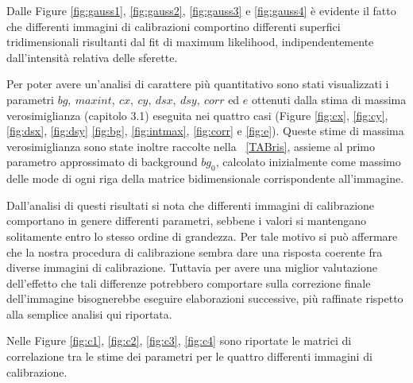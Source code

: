 Dalle Figure \ref{fig:gauss1}, \ref{fig:gauss2}, \ref{fig:gauss3} e \ref{fig:gauss4} è evidente il fatto che differenti immagini di calibrazioni comportino differenti superfici tridimensionali risultanti dal fit di maximum likelihood, indipendentemente dall'intensità relativa delle sferette.

Per poter avere un'analisi di carattere più quantitativo sono stati visualizzati i parametri $bg,\ maxint,\ cx,\ cy,\ dsx,\ dsy,\ corr$ ed $e$ ottenuti dalla stima di massima verosimiglianza (capitolo 3.1) eseguita nei quattro casi (Figure \ref{fig:cx}, \ref{fig:cy}, \ref{fig:dsx}, \ref{fig:dsy} \ref{fig:bg}, \ref{fig:intmax}, \ref{fig:corr} e \ref{fig:e}).
Queste stime di massima verosimiglianza sono state inoltre raccolte nella \tablename~\ref{TABris}, assieme al primo parametro approssimato di background $bg_0$, calcolato inizialmente come massimo delle mode di ogni riga della matrice bidimensionale corrispondente all'immagine.

Dall'analisi di questi risultati si nota che differenti immagini di calibrazione comportano in genere differenti parametri, sebbene i valori si mantengano solitamente entro lo stesso ordine di grandezza. 
Per tale motivo si può affermare che la nostra procedura di calibrazione sembra dare una risposta coerente fra diverse immagini di calibrazione.
Tuttavia per avere una miglior valutazione dell'effetto che tali differenze potrebbero comportare sulla correzione finale dell'immagine bisognerebbe eseguire elaborazioni successive, più raffinate rispetto alla semplice analisi qui riportata.

Nelle Figure \ref{fig:c1}, \ref{fig:c2}, \ref{fig:c3}, \ref{fig:c4} sono riportate le matrici di correlazione tra le stime dei parametri per le quattro differenti immagini di calibrazione.

